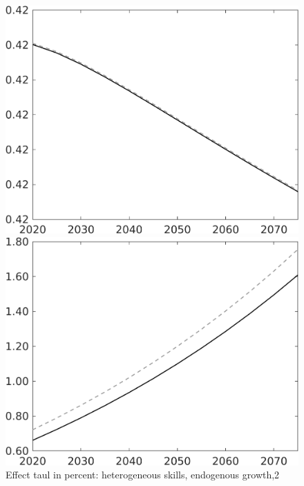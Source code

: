 \documentclass[12pt]{article}
\begin{document}
\begin{figure}[h!!]
	\centering
	\caption{Effect taul in percent: heterogeneous skills, endogenous growth,2}\label{fig:LF_BAU_nsk0_xgr02}
	
	\begin{minipage}[]{0.32\textwidth}
		\includegraphics[width=1\textwidth]{../../codding_model/own_basedOnFried/optimalPol_010922_revision/figures/all_13Sept22/CompTaul_LFBAU_Reg0_EY_spillover0_nsk0_xgr0_knspil0_sep1_countec0_GovRev0_etaa0.79_lgd0.png}
	\end{minipage}	
	\begin{minipage}[]{0.32\textwidth}
		\includegraphics[width=1\textwidth]{../../codding_model/own_basedOnFried/optimalPol_010922_revision/figures/all_13Sept22/CompTaul_LFBAU_Reg0_N_spillover0_nsk0_xgr0_knspil0_sep1_countec0_GovRev0_etaa0.79_lgd0.png}

\end{minipage}
\end{figure}
\end{document}

